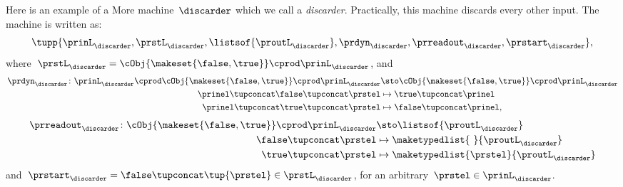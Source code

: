 \begin{example}[Discarder]
    Here is an example of a More machine~$\discarder$ which we call a \emph{discarder}.
    Practically, this machine discards every other input.
    The machine is written as:
    \begin{equation}
        \tupp{\prinL_{\discarder},\prstL_{\discarder},\listsof{\proutL_{\discarder}},\prdyn_{\discarder},\prreadout_{\discarder},\prstart_{\discarder}},
    \end{equation}
    where~$\prstL_{\discarder}= \cObj{\makeset{\false,\true}} \cprod \prinL_\discarder$, and
    \begin{equation}
        \begin{aligned}
            \prdyn_\discarder\colon \prinL_\discarder \cprod \cObj{\makeset{\false,\true}} \cprod \prinL_\discarder & \sto \cObj{\makeset{\false,\true}} \cprod \prinL_\discarder \\
            \prinel \tupconcat \false \tupconcat \prstel                                                            & \mapsto \true \tupconcat \prinel \\
            \prinel \tupconcat \true \tupconcat \prstel                                                             & \mapsto \false \tupconcat \prinel,
        \end{aligned}
    \end{equation}
    \begin{equation}
        \begin{aligned}
            \prreadout_\discarder\colon \cObj{\makeset{\false,\true}} \cprod \prinL_\discarder & \sto \listsof{\proutL_\discarder} \\
            \false \tupconcat \prstel                                                          & \mapsto \maketypedlist{ \ }{\proutL_\discarder} \\
            \true \tupconcat \prstel                                                           & \mapsto \maketypedlist{\prstel}{\proutL_\discarder}
        \end{aligned}
    \end{equation}
    and~$\prstart_\discarder = \false \tupconcat \tup{\prstel} \in \prstL_\discarder$, for an arbitrary~$\prstel\in \prinL_\discarder$.
\end{example}


